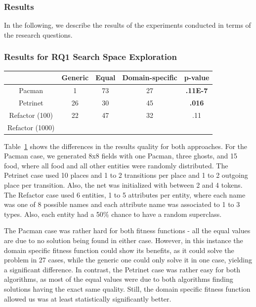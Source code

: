 

\subsubsection{Results}

In the following, we describe the results of the experiments conducted in terms of the research questions.

\subsubsection{Results for RQ1 Search Space Exploration}

\begin{table}
\centering
\begin{tabular}{|c|c|c|c|c|}
\hline
 & Generic & Equal & Domain-specific & p-value \\
\hline
Pacman & 1 & 73 & 27 & \textbf{.11E-7} \\
\hline
Petrinet & 26 & 30 & 45 & \textbf{.016} \\
\hline
Refactor (100) & 22 & 47 & 32 & .11 \\
\hline
Refactor (1000) & & & & \\
\hline
\end{tabular}
\label{tab:resultsrq1}
\end{table}

Table~\ref{tab:resultsrq1} shows the differences in the results quality for both approaches. 
 For the Pacman case, we generated 8x8 fields with one Pacman, three ghosts, and 15 food, where all food and all other entities were randomly distributed. The Petrinet case used 10 places and 1 to 2 transitions per place and 1 to 2 outgoing place per transition. Also, the net was initialized with between 2 and 4 tokens. The Refactor case used 6 entities, 1 to 5 attributes per entity, where each name was one of 8 possible names and each attribute name was associated to 1 to 3 types. Also, each entity had a 50\% chance to have a random superclass.

The Pacman case was rather hard for both fitness functions - all the equal values are due to no solution being found in either case. However, in this instance the domain specific fitness function could show its benefits, as it could solve the problem in 27 cases, while the generic one could only solve it in one case, yielding a significant difference. In contrast, the Petrinet case was rather easy for both algorithms, as most of the equal values were due to both algorithms finding solutions having the exact same quality. Still, the domain specific fitness function allowed us was at least statistically significantly better.

